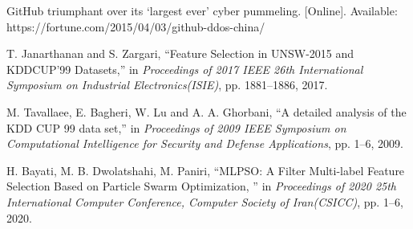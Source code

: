 \begin{thebibliography}{00}
    GitHub triumphant over its ‘largest ever’ cyber pummeling. [Online]. Available: \\ https://fortune.com/2015/04/03/github-ddos-china/

    T. Janarthanan and S. Zargari, ``Feature Selection in UNSW-2015 and KDDCUP'99 Datasets,'' in \emph{Proceedings of 2017 IEEE 26th International Symposium on Industrial Electronics(ISIE)}, pp. 1881--1886, 2017.
    
    M. Tavallaee, E. Bagheri, W. Lu and A. A. Ghorbani, ``A detailed analysis of the KDD CUP 99 data set,'' in \emph{Proceedings of 2009 IEEE Symposium on Computational Intelligence for Security and Defense Applications}, pp. 1--6, 2009.

    H. Bayati, M. B. Dwolatshahi, M. Paniri, ``MLPSO: A Filter Multi-label Feature Selection Based on Particle Swarm Optimization, '' in \emph{Proceedings of 2020 25th International Computer Conference, Computer Society of Iran(CSICC)}, pp. 1--6, 2020.

    
\end{thebibliography}